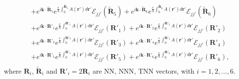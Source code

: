 \begin{equation}
\begin{aligned}
		& + e^{i\mathbf{k\cdot}\tilde{\mathbf{R}}_{5} }e^{\frac{e}{\hbar}\int_{0}^{\tilde{\mathbf{R}}_{5}}A(\mathbf{r'})d\mathbf{r'}} \mathcal{E}_{jj'}(\tilde{\mathbf{R}}_{5})+ e^{i\mathbf{k\cdot}\tilde{\mathbf{R}}_{6} }e^{\frac{e}{\hbar}\int_{0}^{\tilde{\mathbf{R}}_{6}}A(\mathbf{r'})d\mathbf{r'}} \mathcal{E}_{jj'}(\tilde{\mathbf{R}}_{6}) \\
		& + e^{i\mathbf{k\cdot}\mathbf{R}'_{1} }e^{\frac{e}{\hbar}\int_{0}^{\mathbf{R}'_{1}}A(\mathbf{r'})d\mathbf{r'}} \mathcal{E}_{jj'}(\mathbf{R}'_{1})+ e^{i\mathbf{k\cdot}\mathbf{R}'_{2} }e^{\frac{e}{\hbar}\int_{0}^{\mathbf{R}'_{2}}A(\mathbf{r'})d\mathbf{r'}} \mathcal{E}_{jj'}(\mathbf{R}'_{2})                                                 \\
		& + e^{i\mathbf{k\cdot}\mathbf{R}'_{3} }e^{\frac{e}{\hbar}\int_{0}^{\mathbf{R}'_{3}}A(\mathbf{r'})d\mathbf{r'}} \mathcal{E}_{jj'}(\mathbf{R}'_{3})+ e^{i\mathbf{k\cdot}\mathbf{R}'_{4} }e^{\frac{e}{\hbar}\int_{0}^{\mathbf{R}'_{4}}A(\mathbf{r'})d\mathbf{r'}} \mathcal{E}_{jj'}(\mathbf{R}'_{4})                                                 \\
		& + e^{i\mathbf{k\cdot}\mathbf{R}'_{5} }e^{\frac{e}{\hbar}\int_{0}^{\mathbf{R}'_{5}}A(\mathbf{r'})d\mathbf{r'}} \mathcal{E}_{jj'}(\mathbf{R}'_{5})+ e^{i\mathbf{k\cdot}\mathbf{R}'_{6} }e^{\frac{e}{\hbar}\int_{0}^{\mathbf{R}'_{6}}A(\mathbf{r'})d\mathbf{r'}} \mathcal{E}_{jj'}(\mathbf{R}'_{6})     ,                                            \\
	\end{aligned}
\end{equation}
where $\mathbf{R}_{i}$, $\tilde{\mathbf{R}}_{i}$ and $\mathbf{R}'_{i} = 2 \mathbf{R}_{i}$ are \ac{NN}, \ac{NNN}, \ac{TNN} vectors, with $i = 1,2,...,6$.


